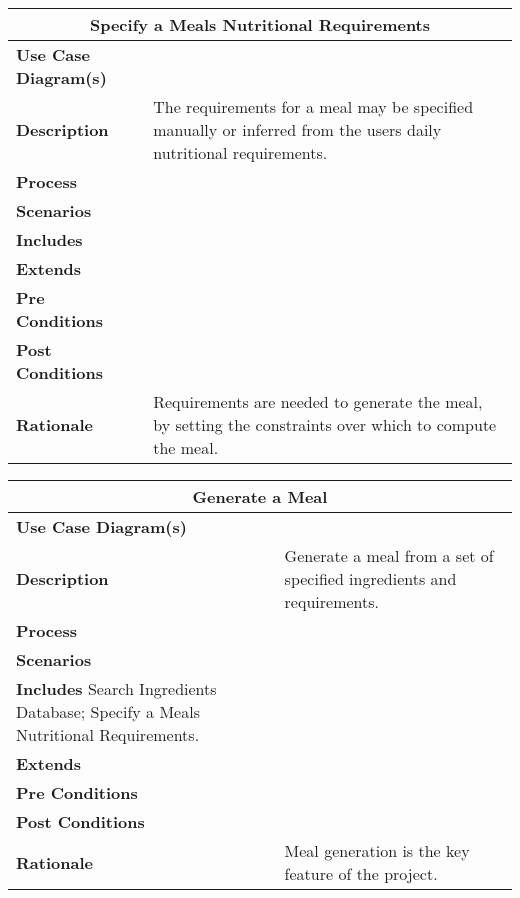 \documentclass[12pt]{article}
\begin{document}
\begin{center}
\begin{tabularx}{\textwidth}{ |X|X|}
\hline
\multicolumn{2}{|c|}{\textbf{Specify a Meals Nutritional Requirements}}\\
\hline
\hline
\textbf{Use Case Diagram(s)} & \\ \hline
\textbf{Description} & The requirements for a meal may be specified manually or inferred from the users daily nutritional requirements.\\ \hline
\textbf{Process} & \\ \hline
\textbf{Scenarios} & \\ \hline
\textbf{Includes} & \\ \hline
\textbf{Extends} &  \\ \hline
\textbf{Pre Conditions} & \\ \hline
\textbf{Post Conditions} & \\ \hline
\textbf{Rationale} & Requirements are needed to generate the meal, by setting the constraints over which to compute the meal.\\ \hline
\end{tabularx}
\end{center}

\begin{center}
\begin{tabularx}{\textwidth}{ |X|X|}
\hline
\multicolumn{2}{|c|}{\textbf{Generate a Meal}}\\
\hline
\hline
\textbf{Use Case Diagram(s)} & \\ \hline
\textbf{Description} & Generate a meal from a set of specified ingredients and requirements.\\ \hline
\textbf{Process} & \\ \hline
\textbf{Scenarios} & \\ \hline
\textbf{Includes} Search Ingredients Database; Specify a Meals Nutritional Requirements. & \\ \hline
\textbf{Extends} &  \\ \hline
\textbf{Pre Conditions} & \\ \hline
\textbf{Post Conditions} & \\ \hline
\textbf{Rationale} & Meal generation is the key feature of the project.\\ \hline
\end{tabularx}
\end{center}
\end{document}
